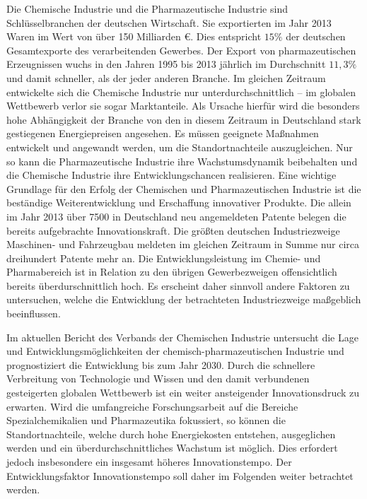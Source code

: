 Die Chemische Industrie und die Pharmazeutische Industrie sind Schl\"usselbranchen der deutschen Wirtschaft. Sie exportierten im Jahr 2013 Waren im Wert von \"uber 150 Milliarden \euro. Dies entspricht $15 \%$ der deutschen Gesamtexporte des verarbeitenden Gewerbes. Der Export von pharmazeutischen Erzeugnissen wuchs in den Jahren 1995 bis 2013 j\"ahrlich im Durchschnitt $11,3 \%$ und damit schneller, als der jeder anderen Branche. Im gleichen Zeitraum entwickelte sich die Chemische Industrie nur unterdurchschnittlich -- im globalen Wettbewerb verlor sie sogar Marktanteile. Als Ursache hierf\"ur wird die besonders hohe Abh\"angigkeit der Branche von den in diesem Zeitraum in Deutschland stark gestiegenen Energiepreisen angesehen. Es m\"ussen geeignete Ma\ss{}nahmen entwickelt und angewandt werden, um die Standortnachteile auszugleichen. Nur so kann die Pharmazeutische Industrie ihre Wachstumsdynamik beibehalten und die Chemische Industrie ihre Entwicklungschancen realisieren. \newline
Eine wichtige Grundlage f\"ur den Erfolg der Chemischen und Pharmazeutischen Industrie ist die best\"andige Weiterentwicklung und Erschaffung innovativer Produkte. Die allein im Jahr 2013 \"uber 7500 in Deutschland neu angemeldeten Patente belegen die bereits aufgebrachte Innovationskraft. Die gr\"o\ss{}ten deutschen Industriezweige Maschinen- und Fahrzeugbau meldeten im gleichen Zeitraum in Summe nur circa dreihundert Patente mehr an. Die Entwicklungsleistung im Chemie- und Pharmabereich ist in Relation zu den \"ubrigen Gewerbezweigen offensichtlich bereits \"uberdurschnittlich hoch. Es erscheint daher sinnvoll andere Faktoren zu untersuchen, welche die Entwicklung der betrachteten Industriezweige ma\ss{}geblich beeinflussen. \cite{PerspektiveD_2016}

Im aktuellen Bericht des Verbands der Chemischen Industrie  untersucht \citeauthor{PerspektiveC_2016} die Lage und Entwicklungsm\"oglichkeiten der chemisch-pharmazeutischen Industrie und prognostiziert die Entwicklung bis zum Jahr 2030. Durch die schnellere Verbreitung von Technologie und Wissen und den damit verbundenen gesteigerten globalen Wettbewerb ist ein weiter ansteigender Innovationsdruck zu erwarten. Wird die umfangreiche Forschungsarbeit auf die Bereiche Spezialchemikalien und Pharmazeutika fokussiert, so k\"onnen die Standortnachteile, welche durch hohe Energiekosten entstehen, ausgeglichen werden und ein \"uberdurchschnittliches Wachstum ist m\"oglich. Dies erfordert jedoch insbesondere ein insgesamt h\"oheres Innovationstempo. Der Entwicklungsfaktor Innovationstempo soll daher im Folgenden weiter betrachtet werden. \cite{PerspektiveC_2016}

